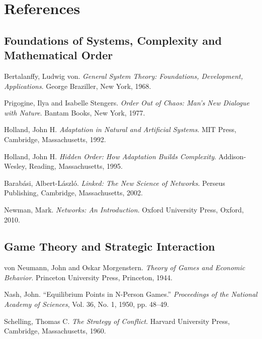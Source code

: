 \documentclass[11pt,openany]{book}
\theoremstyle{plain}
\theoremstyle{definition}
\begin{document}
\backmatter

\chapter*{References}

\section*{Foundations of Systems, Complexity and Mathematical Order}

Bertalanffy, Ludwig von. 
\textit{General System Theory: Foundations, Development, Applications}.
George Braziller, New York, 1968.

Prigogine, Ilya and Isabelle Stengers.
\textit{Order Out of Chaos: Man's New Dialogue with Nature}.
Bantam Books, New York, 1977.

Holland, John H.
\textit{Adaptation in Natural and Artificial Systems}.
MIT Press, Cambridge, Massachusetts, 1992.

Holland, John H.
\textit{Hidden Order: How Adaptation Builds Complexity}.
Addison-Wesley, Reading, Massachusetts, 1995.

Barabási, Albert-László.
\textit{Linked: The New Science of Networks}.
Perseus Publishing, Cambridge, Massachusetts, 2002.

Newman, Mark.
\textit{Networks: An Introduction}.
Oxford University Press, Oxford, 2010.


\section*{Game Theory and Strategic Interaction}

von Neumann, John and Oskar Morgenstern.
\textit{Theory of Games and Economic Behavior}.
Princeton University Press, Princeton, 1944.

Nash, John.
``Equilibrium Points in N-Person Games.''
\textit{Proceedings of the National Academy of Sciences},
Vol. 36, No. 1, 1950, pp. 48--49.

Schelling, Thomas C.
\textit{The Strategy of Conflict}.
Harvard University Press, Cambridge, Massachusetts, 1960.

\end{document}
